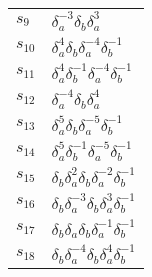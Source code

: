 \documentclass{article}
\begin{document}
\begin{center}
\begin{tabular}{ll}
$s_{9}$ & $\delta_a^{-3}\delta_b^{}\delta_a^{3}$ \\
$s_{10}$ & $\delta_a^{4}\delta_b^{}\delta_a^{-4}\delta_b^{-1}$ \\
$s_{11}$ & $\delta_a^{4}\delta_b^{-1}\delta_a^{-4}\delta_b^{-1}$ \\
$s_{12}$ & $\delta_a^{-4}\delta_b^{}\delta_a^{4}$ \\
$s_{13}$ & $\delta_a^{5}\delta_b^{}\delta_a^{-5}\delta_b^{-1}$ \\
$s_{14}$ & $\delta_a^{5}\delta_b^{-1}\delta_a^{-5}\delta_b^{-1}$ \\
$s_{15}$ & $\delta_b^{}\delta_a^{2}\delta_b^{}\delta_a^{-2}\delta_b^{-1}$ \\
$s_{16}$ & $\delta_b^{}\delta_a^{-3}\delta_b^{}\delta_a^{3}\delta_b^{-1}$ \\
$s_{17}$ & $\delta_b^{}\delta_a^{}\delta_b^{}\delta_a^{-1}\delta_b^{-1}$ \\
$s_{18}$ & $\delta_b^{}\delta_a^{-4}\delta_b^{}\delta_a^{4}\delta_b^{-1}$ \\
\bottomrule
\end{tabular}
\end{center}

\thispagestyle{empty}
\end{document}
